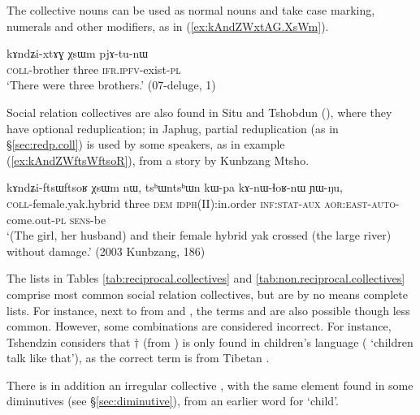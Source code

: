 The collective nouns can be used as normal nouns and take case marking, numerals and other modifiers, as in   (\ref{ex:kAndZWxtAG.XsWm}).

\begin{exe}
\ex \label{ex:kAndZWxtAG.XsWm}
\gll  kɤndʑi-xtɤɣ χsɯm pjɤ-tu-nɯ \\
\textsc{coll}-brother three \textsc{ifr}.\textsc{ipfv}-exist-\textsc{pl} \\
\glt `There were three brothers.' (07-deluge, 1)
\end{exe}

Social relation collectives are also found in Situ and Tshobdun (\citealt[107]{jackson98morphology}), where they have optional reduplication; in Japhug, partial reduplication (as in §\ref{sec:redp.coll}) is used by some speakers, as  in example (\ref{ex:kAndZWftsWftsoR}), from a story by Kunbzang Mtsho.

\begin{exe}
\ex \label{ex:kAndZWftsWftsoR}
 \gll kɤndʑi-ftsɯ\redp{}ftsoʁ χsɯm nɯ, tsʰɯntsʰɯn kɯ-pa kɤ-nɯ-ɬoʁ-nɯ ɲɯ-ŋu, \\
 \textsc{coll}-female.yak.hybrid three \textsc{dem} \textsc{idph}(II):in.order \textsc{inf}:\textsc{stat}-\textsc{aux} \textsc{aor}:\textsc{east}-\textsc{auto}-come.out-\textsc{pl} \textsc{sens}-be \\
\glt `(The girl, her husband) and their female hybrid yak crossed (the large river) without damage.' (2003 Kunbzang, 186)
\end{exe}

The lists in Tables \ref{tab:reciprocal.collectives} and \ref{tab:non.reciprocal.collectives} comprise most common social relation collectives, but are by no means complete lists. For instance, next to  from  and , the terms  and  are also possible though less common. However, some combinations are considered incorrect. For instance, Tshendzin considers that $\dagger$ (from ) is only found in children's language ( `children talk like that'), as the correct term  is  from Tibetan .

There is in addition an irregular collective , with the same element  found in some diminutives (see §\ref{sec:diminutive}), from an earlier word for `child'.

